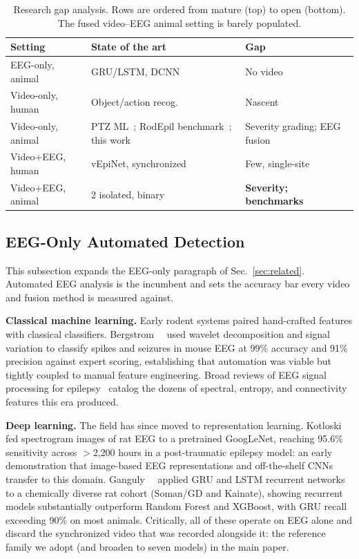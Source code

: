 \begin{table}[t]
\centering
\caption{Research gap analysis. Rows are ordered from mature (top) to open
(bottom). The fused video--EEG animal setting is barely populated.}
\label{tab:gap}
\setlength{\tabcolsep}{4pt}
\renewcommand{\arraystretch}{1.2}
\begin{tabular}{@{}p{2.5cm} p{2.6cm} p{2.4cm}@{}}
\toprule
\textbf{Setting} & \textbf{State of the art} & \textbf{Gap} \\
\midrule
EEG-only, animal & GRU/LSTM, DCNN~\cite{ganguly2025,martin2023} & No video \\
Video-only, human & Object/action recog.~\cite{karacsony2020seizure} & Nascent \\
Video-only, animal & PTZ ML~\cite{sabnis2024}; RodEpil benchmark~\cite{rodepil2025}; this work & Severity grading; EEG fusion \\
Video$+$EEG, human & vEpiNet, synchronized~\cite{vepinet2024,cao2024} & Few, single-site \\
\rowcolor{wacvblue!12}
Video$+$EEG, animal & 2 isolated, binary~\cite{mullen2024,eegvfusion2026} & \textbf{Severity; benchmarks} \\
\bottomrule
\end{tabular}
\end{table}

\subsection{EEG-Only Automated Detection}
\label{sec:eeg}

This subsection expands the EEG-only paragraph of Sec.~\ref{sec:related}.
Automated EEG analysis is the incumbent and sets the accuracy bar every video and
fusion method is measured against.

\noindent\textbf{Classical machine learning.}
Early rodent systems paired hand-crafted features with classical classifiers.
Bergstrom~\etal~\cite{bergstrom2013} used wavelet decomposition and signal
variation to classify spikes and seizures in mouse EEG at 99\% accuracy and 91\%
precision against expert scoring, establishing that automation was viable but
tightly coupled to manual feature engineering. Broad reviews of EEG signal
processing for epilepsy~\cite{frontiers_review2024,ganguly2025_review_acm}
catalog the dozens of spectral, entropy, and connectivity features this era
produced.

\noindent\textbf{Deep learning.}
The field has since moved to representation learning. Kotloski~\cite{martin2023}
fed spectrogram images of rat EEG to a pretrained GoogLeNet, reaching 95.6\%
sensitivity across $>$2{,}200 hours in a post-traumatic epilepsy model: an early
demonstration that image-based EEG representations and off-the-shelf CNNs
transfer to this domain. Ganguly~\etal~\cite{ganguly2025} applied GRU and LSTM
recurrent networks to a chemically diverse rat cohort (Soman/GD and Kainate),
showing recurrent models substantially outperform Random Forest and XGBoost,
with GRU recall exceeding 90\% on most animals. Critically, all
of these operate on EEG alone and discard the synchronized video that was
recorded alongside it: the reference family we adopt (and broaden to seven
models) in the main paper.

